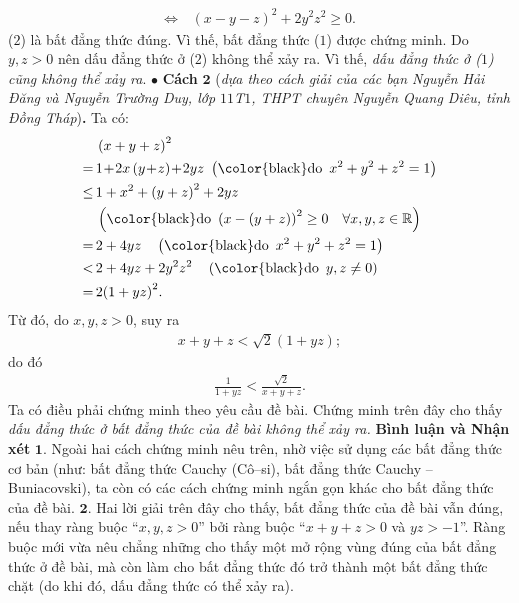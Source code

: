 \begin{multicols}{2}
\begin{align*}
		\Leftrightarrow \,&{\left( {x - y - z} \right)^2} + 2{y^2}{z^2} \ge 0. \tag{$2$}
	\end{align*}
	($2$) là bất đẳng thức đúng. Vì thế, bất đẳng thức ($1$) được chứng minh.
	\vskip 0.05cm
	Do $y, z > 0$ nên dấu đẳng thức ở ($2$) không thể xảy ra. Vì thế, \textit{dấu đẳng thức ở \textrm{($1$)} cũng không thể xảy ra}.
	\vskip 0.05cm
	$\bullet$ \textbf{\color{thachthuctoanhoc}Cách} $\pmb{2}$ (\textit{dựa theo cách giải của các bạn Nguyễn Hải Đăng và Nguyễn Trường Duy, lớp $11$T$1$, THPT chuyên Nguyễn Quang Diêu, tỉnh Đồng Tháp})\textbf{\color{thachthuctoanhoc}.}
	\vskip 0.05cm
	Ta có:
	\begin{align*}
			&\left( {x + y + z} \right)^2 \\
			= \,&1 \!+\! 2x\left( {y \!+\! z} \right) \!+\! 2yz\,\,\left(\text{\color{black}do \,}{x^2} + {y^2} + {z^2} = 1 \right)\\
			 \le\,& 1 + {x^2} + {\left( {y + z} \right)^2} + 2yz\\
			 &\left({{\text{\color{black}do \,}}{{\left( {x - \left( {y + z} \right)} \right)}^2} \ge 0\quad\forall x,y,z \in \mathbb{R}} \right)\\
			 = \,&2 + 4yz\quad\left( {\text{\color{black}do \,}{x^2} + {y^2} + {z^2} = 1} \right)\\
			 < \,&2 + 4yz + 2{y^2}{z^2}\quad\left( {\text{\color{black}do \,}y,z \ne 0} \right)\\
			 = \,&2{\left( {1 + yz} \right)^2}.
	\end{align*}
	Từ đó, do $x, y, z > 0$, suy ra
	\begin{align*}
		x + y + z < \sqrt 2 \left( {1 + yz} \right);
	\end{align*}
	do đó
	\begin{align*}
		\frac{1}{{1 + yz}} < \frac{{\sqrt 2 }}{{x + y + z}}.
	\end{align*}
	Ta có điều phải chứng minh theo yêu cầu đề bài.
	\vskip 0.05cm
	Chứng minh trên đây cho thấy \textit{dấu đẳng thức ở bất đẳng thức của đề bài không thể xảy ra.}
	\vskip 0.05cm
	\textbf{\color{thachthuctoanhoc}Bình luận và Nhận xét}
	\vskip 0.05cm
	$\pmb{1.}$ Ngoài hai cách chứng minh nêu trên, nhờ việc sử dụng các bất đẳng thức cơ bản (như: bất đẳng thức Cauchy (Cô--si), bất đẳng thức Cauchy -- Buniacovski), ta còn có các cách chứng minh ngắn gọn khác cho bất đẳng thức của đề bài.
	\vskip 0.05cm
	$\pmb{2.}$ Hai lời giải trên đây cho thấy, bất đẳng thức của đề bài vẫn đúng, nếu thay ràng buộc “$x, y, z > 0$” bởi ràng buộc “$x + y + z > 0$ và $yz > -1$”. Ràng buộc mới vừa nêu chẳng những cho thấy một mở rộng vùng đúng của bất đẳng thức ở đề bài, mà còn làm cho bất đẳng thức đó trở thành một bất đẳng thức chặt (do khi đó, dấu đẳng thức có thể xảy ra).

\end{multicols}
